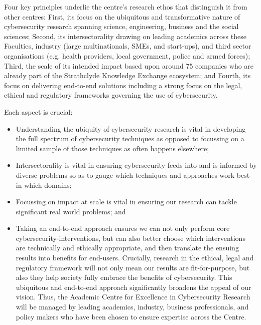 \documentclass[11pt]{article}
\begin{document}
Four key principles underlie the centre's research ethos that distinguish it from other centres: First, its focus on the ubiquitous and transformative nature of cybersecurity research spanning science, engineering, business and the social sciences; Second, its intersectorality drawing on leading academics across these Faculties, industry (large multinationals, SMEs, and start-ups), and third sector organisations (e.g. health providers, local government, police and armed forces); Third, the scale of its intended impact based upon around 75 companies who are already part of the Strathclyde Knowledge Exchange ecosystem; and Fourth, its focus on delivering end-to-end solutions including a strong focus on the legal, ethical and regulatory frameworks governing the use of cybersecurity. 

Each aspect is crucial:
\begin{itemize}
\item Understanding the ubiquity of cybersecurity
research is vital in developing the full spectrum of cybersecurity
techniques as opposed to focussing on a limited sample of those
techniques as often happens elsewhere; 

\item  Intersectorality is vital
in ensuring cybersecurity feeds into and is informed by diverse
problems so as to gauge which techniques and approaches work best in
which domains; 

\item Focussing on impact at scale is vital in ensuring
  our research can tackle significant real world problems; and

\item Taking an end-to-end approach ensures we can not only perform core
cybersecurity-interventions, but can also better choose which
interventions are technically and ethically appropriate, and then
translate the ensuing results into benefits for end-users. Crucially,
research in the ethical, legal and regulatory framework will not only
mean our results are fit-for-purpose, but also they help society fully
embrace the benefits of cybersecurity. This ubiquitous and end-to-end
approach significantly broadens the appeal of our vision. Thus, the
Academic Centre for Excellence in Cybersecurity Research will be
managed by leading academics, industry, business professionals, and
policy makers who have been chosen to ensure expertise across the
Centre.
\end{itemize}
    
\end{document}
